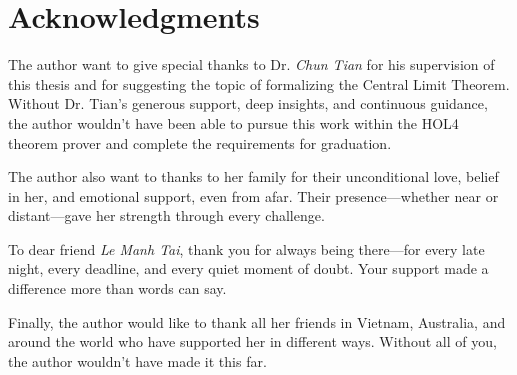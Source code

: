 \section*{Acknowledgments}

The author want to give special thanks to Dr. \emph{Chun Tian} for his supervision of this thesis and for suggesting the topic of formalizing the Central Limit Theorem. Without Dr. Tian’s generous support, deep insights, and continuous guidance, the author wouldn't have been able to pursue this work within the HOL4 theorem prover and complete the requirements for graduation.

The author also want to thanks to her family for their unconditional love, belief in her, and emotional support, even from afar. Their presence—whether near or distant—gave her strength through every challenge.

To dear friend \emph{Le Manh Tai}, thank you for always being there—for every late night, every deadline, and every quiet moment of doubt. Your support made a difference more than words can say.

Finally, the author would like to thank all her friends in Vietnam, Australia, and around the world who have supported her in different ways. Without all of you, the author wouldn’t have made it this far.
